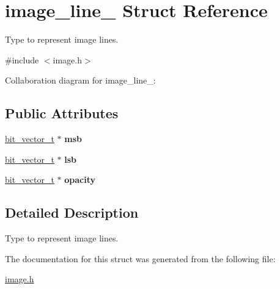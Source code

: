 \hypertarget{structimage__line__}{}\section{image\+\_\+line\+\_\+ Struct Reference}
\label{structimage__line__}


Type to represent image lines.  




{\ttfamily \#include $<$image.\+h$>$}



Collaboration diagram for image\+\_\+line\+\_\+\+:
\subsection*{Public Attributes}
\begin{DoxyCompactItemize}
\item 
\mbox{\label{structimage__line___aadb65f2f2a684d7fd41e8d37bc9f0a59}} 
\hyperlink{structbit__vector__t}{bit\+\_\+vector\+\_\+t} $\ast$ {\bfseries msb}
\item 
\mbox{\label{structimage__line___aa7d4d8e1017a2ab9bd70d1e48662d002}} 
\hyperlink{structbit__vector__t}{bit\+\_\+vector\+\_\+t} $\ast$ {\bfseries lsb}
\item 
\mbox{\label{structimage__line___a1083cfebceb629b558d0317b085d3f32}} 
\hyperlink{structbit__vector__t}{bit\+\_\+vector\+\_\+t} $\ast$ {\bfseries opacity}
\end{DoxyCompactItemize}


\subsection{Detailed Description}
Type to represent image lines. 

The documentation for this struct was generated from the following file\+:\begin{DoxyCompactItemize}
\item 
\hyperlink{image_8h}{image.\+h}\end{DoxyCompactItemize}

